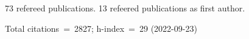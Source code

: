 73 refereed publications. 13 refeered publications as first author.

Total citations~=~2827; h-index~=~29 (2022-09-23)